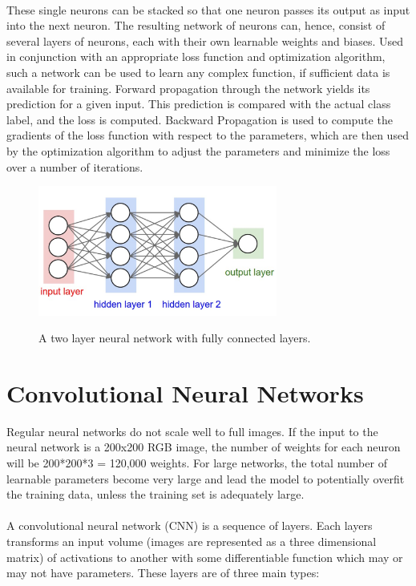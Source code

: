 \documentclass[12pt, a4paper]{report}
\begin{document}
\paragraph{}
These single neurons can be stacked so that one neuron passes its output as input into the next neuron. The resulting network of neurons can, hence, consist of several layers of neurons, each with their own learnable weights and biases. Used in conjunction with an appropriate loss function and optimization algorithm, such a network can be used to learn any complex function, if sufficient data is available for training. Forward propagation through the network yields its prediction for a given input. This prediction is compared with the actual class label, and the loss is computed. Backward Propagation is used to compute the gradients of the loss function with respect to the parameters, which are then used by the optimization algorithm to adjust the parameters and minimize the loss over a number of iterations.
\begin{figure}[h]
\centering
\includegraphics[width=0.7\textwidth]{nn2.png}
\caption{A two layer neural network with fully connected layers.}\cite{cs231n}
\end{figure}

\section{Convolutional Neural Networks}
Regular neural networks do not scale well to full images. If the input to the neural network is a 200x200 RGB image, the number of weights for each neuron will be 200*200*3 = 120,000 weights. For large networks, the total number of learnable parameters become very large and lead the model to potentially overfit the training data, unless the training set is adequately large.
\paragraph{}
A convolutional neural network (CNN) is a sequence of layers. Each layers transforms an input volume (images are represented as a three dimensional matrix) of activations to another with some differentiable function which may or may not have parameters.\cite{cs231n, dlai4} These layers are of three main types:
\end{document}
